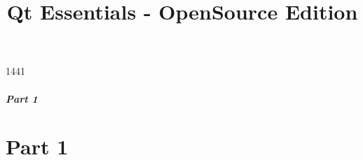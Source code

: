 \documentclass[t]{beamer}
\title{Qt Essentials - OpenSource Edition}
\begin{document}


\begin{slide}{1441}
  \frametitle{Part 1}
  \tableofcontents[part=1]
\end{slide}

\part{Part 1}


%


\end{document}
